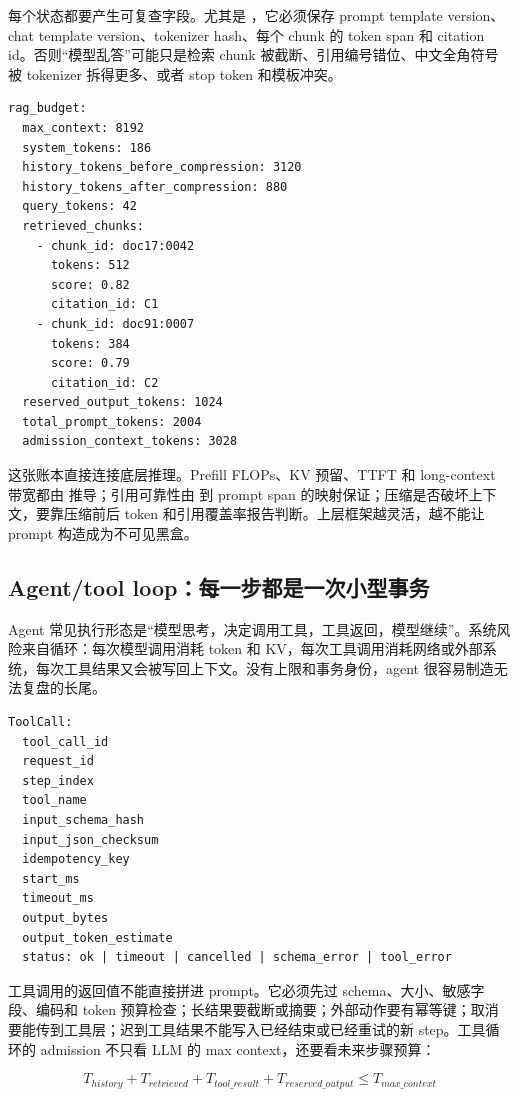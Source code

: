 每个状态都要产生可复查字段。尤其是 ，它必须保存 prompt template version、chat template version、tokenizer hash、每个 chunk 的 token span 和 citation id。否则“模型乱答”可能只是检索 chunk 被截断、引用编号错位、中文全角符号被 tokenizer 拆得更多、或者 stop token 和模板冲突。

\begin{lstlisting}[numbers=none,caption={RAG prompt budget 报告}]
rag_budget:
  max_context: 8192
  system_tokens: 186
  history_tokens_before_compression: 3120
  history_tokens_after_compression: 880
  query_tokens: 42
  retrieved_chunks:
    - chunk_id: doc17:0042
      tokens: 512
      score: 0.82
      citation_id: C1
    - chunk_id: doc91:0007
      tokens: 384
      score: 0.79
      citation_id: C2
  reserved_output_tokens: 1024
  total_prompt_tokens: 2004
  admission_context_tokens: 3028
\end{lstlisting}

这张账本直接连接底层推理。Prefill FLOPs、KV 预留、TTFT 和 long-context 带宽都由  推导；引用可靠性由  到 prompt span 的映射保证；压缩是否破坏上下文，要靠压缩前后 token 和引用覆盖率报告判断。上层框架越灵活，越不能让 prompt 构造成为不可见黑盒。

\subsection{Agent/tool loop：每一步都是一次小型事务}

Agent 常见执行形态是“模型思考，决定调用工具，工具返回，模型继续”。系统风险来自循环：每次模型调用消耗 token 和 KV，每次工具调用消耗网络或外部系统，每次工具结果又会被写回上下文。没有上限和事务身份，agent 很容易制造无法复盘的长尾。

\begin{lstlisting}[numbers=none,caption={tool call 事务字段}]
ToolCall:
  tool_call_id
  request_id
  step_index
  tool_name
  input_schema_hash
  input_json_checksum
  idempotency_key
  start_ms
  timeout_ms
  output_bytes
  output_token_estimate
  status: ok | timeout | cancelled | schema_error | tool_error
\end{lstlisting}

工具调用的返回值不能直接拼进 prompt。它必须先过 schema、大小、敏感字段、编码和 token 预算检查；长结果要截断或摘要；外部动作要有幂等键；取消要能传到工具层；迟到工具结果不能写入已经结束或已经重试的新 step。工具循环的 admission 不只看 LLM 的 max context，还要看未来步骤预算：

\[
T_{history}+T_{retrieved}+T_{tool\_result}+T_{reserved\_output}
  \le T_{max\_context}
\]

